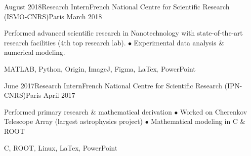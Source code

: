\begin{experiences}
  \experience
    {August 2018}{Research Intern}{French National Centre for Scientific Research (ISMO-CNRS)}{Paris}
    {March 2018}
    {
\begin{description}
Performed advanced scientific research in Nanotechnology with state-of-the-art research facilities (4th top research lab). $\bullet$ Experimental data analysis \& numerical modeling.
\end{description}
}
    {MATLAB, Python, Origin, ImageJ, Figma, LaTex, PowerPoint}
\end{experiences}

\begin{experiences}
  \experience
    {June 2017}{Research Intern}{French National Centre for Scientific Research (IPN-CNRS)}{Paris}
    {April 2017}
    {
\begin{description}
Performed primary research \& mathematical derivation $\bullet$ Worked on Cherenkov Telescope Array (largest astrophysics project) $\bullet$ Mathematical modeling in C \& ROOT
\end{description}
}
    {C, ROOT, Linux, LaTex, PowerPoint}
\end{experiences} 